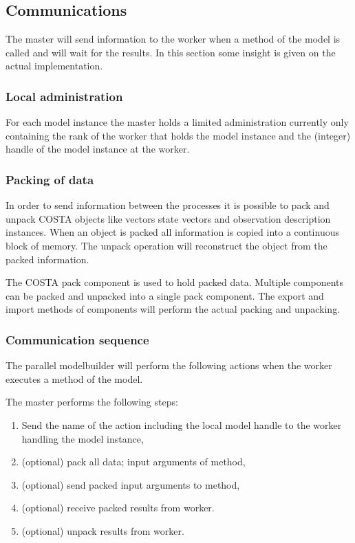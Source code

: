 \subsection{Communications}
The master will send information to the worker when a method of the model
is called and will wait for the results. In this section some insight is
given on the actual implementation.

\subsubsection{Local administration}
For each model instance the master holds a limited administration currently
only containing the rank of the worker that holds the model instance and
the (integer) handle of the model instance at the worker.

\subsubsection{Packing of data}
In order to send information between the processes it is possible to pack
and unpack COSTA objects like vectors state vectors and observation
description instances. 
When an object is packed all information is copied into a continuous block
of memory. The unpack operation will reconstruct the object from the packed
information.

The COSTA pack component is used to hold packed data. Multiple components
can be packed and unpacked into a single pack component. The export and
import methods of components will perform the actual packing and unpacking. 

\subsubsection{Communication sequence}
The parallel modelbuilder will perform the following actions when the worker
executes a method of the model.

The master performs the following steps:
\begin{enumerate}
\item Send the name of the action including the local model handle to the
      worker handling the model instance,
\item (optional) pack all data; input arguments of method,
\item (optional) send packed input arguments to method,
\item (optional) receive packed results from worker.
\item (optional) unpack results from worker.
\end{enumerate}

